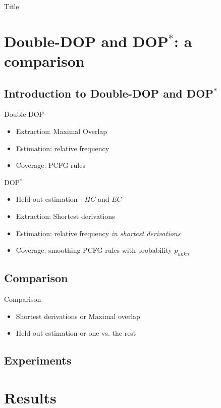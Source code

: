 \documentclass{beamer}
\newcommand{\dops}[0]{DOP$ ^*$}
\newcommand{\ddop}[0]{Double-DOP}
\begin{document}
\begin{frame}{Title}
\end{frame}

\section{\ddop{} and \dops{}: a comparison}

\subsection{Introduction to \ddop{} and \dops{}}
\begin{frame}{\ddop{}}
\begin{itemize}
\item Extraction: Maximal Overlap
\item Estimation: relative frequency 
\item Coverage: PCFG rules
\end{itemize}
\end{frame}

\begin{frame}{\dops{}}
\begin{itemize}
\item Held-out estimation - $HC$ and $EC$
\item Extraction: Shortest derivations
\item Estimation: relative frequency \emph{in shortest derivations}
\item Coverage: smoothing PCFG rules with probability $p_{unkn}$
\end{itemize}
\end{frame}

\subsection{Comparison}
\begin{frame}{Comparison}
\begin{itemize}
\item Shortest derivations or Maximal overlap
\item Held-out estimation or one vs. the rest
\end{itemize}
\end{frame}

\subsection{Experiments}


\section{Results}
\end{document}
